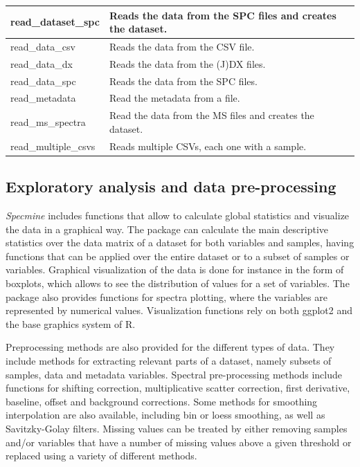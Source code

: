 \begin{scriptsize}
\begin{longtable}{|m{4.3cm}|m{10cm}|}
		\hline
		read\_dataset\_spc & Reads the data from the SPC files and creates the dataset. \\
		
		\hline
		read\_data\_csv & Reads the data from the CSV file. \\
		
		\hline
		read\_data\_dx & Reads the data from the (J)DX files. \\
		
		\hline
		read\_data\_spc & Reads the data from the SPC files. \\
		
		\hline
		read\_metadata & Read the metadata from a file. \\
		
		\hline
		read\_ms\_spectra & Read the data from the MS files and creates the dataset. \\
		
		\hline
		read\_multiple\_csvs & Reads multiple CSVs, each one with a sample. \\
		
		\hline
		
	\end{longtable}
\end{scriptsize}

\subsection{Exploratory analysis and data pre-processing}

\textit{Specmine} includes functions that allow to calculate global statistics and visualize the data in a graphical way. The package can calculate the main descriptive statistics over the data matrix of a dataset for both variables and samples, having functions that can be applied over the entire dataset or to a subset of samples or variables. Graphical visualization of the data is done for instance in the form of boxplots, which allows to see the distribution of values for a set of variables. The package also provides functions for spectra plotting, where the variables are represented by numerical values. Visualization functions rely on both ggplot2 and the base graphics system of R.

Preprocessing methods are also provided for the different types of data. They include methods for extracting relevant parts of a dataset, namely subsets of samples, data and metadata variables. Spectral pre-processing methods include functions for shifting correction, multiplicative scatter correction, first derivative, baseline, offset and background corrections. Some methods for smoothing interpolation are also available, including bin or loess smoothing, as well as Savitzky-Golay filters. Missing values can be treated by either removing samples and/or variables that have a number of missing values above a given threshold or replaced using a variety of different methods. 

